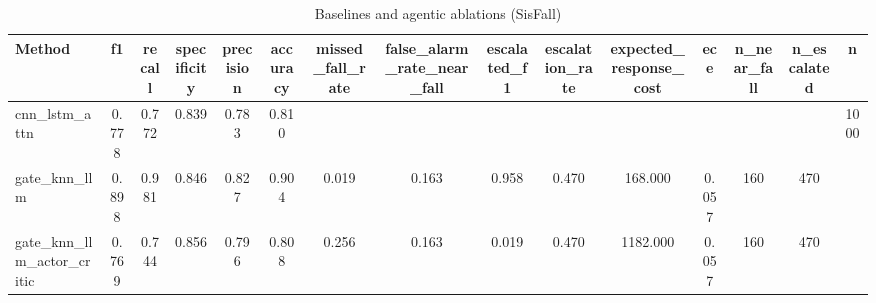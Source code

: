 \begin{table}[t]
\centering
\caption{Baselines and agentic ablations (SisFall)}
\begin{tabular}{lcccccccccccccc}
\toprule
Method & f1 & recall & specificity & precision & accuracy & missed_fall_rate & false_alarm_rate_near_fall & escalated_f1 & escalation_rate & expected_response_cost & ece & n_near_fall & n_escalated & n \\
\midrule
cnn_lstm_attn & 0.778 & 0.772 & 0.839 & 0.783 & 0.810 &  &  &  &  &  &  &  &  & 1000 \\
gate_knn_llm & 0.898 & 0.981 & 0.846 & 0.827 & 0.904 & 0.019 & 0.163 & 0.958 & 0.470 & 168.000 & 0.057 & 160 & 470 &  \\
gate_knn_llm_actor_critic & 0.769 & 0.744 & 0.856 & 0.796 & 0.808 & 0.256 & 0.163 & 0.019 & 0.470 & 1182.000 & 0.057 & 160 & 470 &  \\
\bottomrule
\end{tabular}
\end{table}